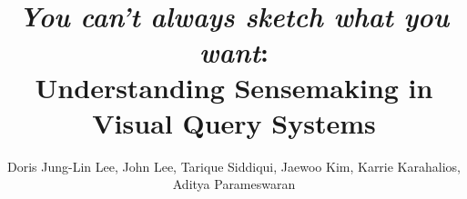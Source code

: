 \documentclass[journal]{vgtc}                %
\title{\emph{You can't always sketch what you want}: \\ Understanding Sensemaking in Visual Query Systems}
\author{Doris Jung-Lin Lee, John Lee, Tarique Siddiqui, Jaewoo Kim, Karrie Karahalios, Aditya Parameswaran}
\begin{document}
\maketitle
\raggedbottom








\newpage


\clearpage

\end{document}
